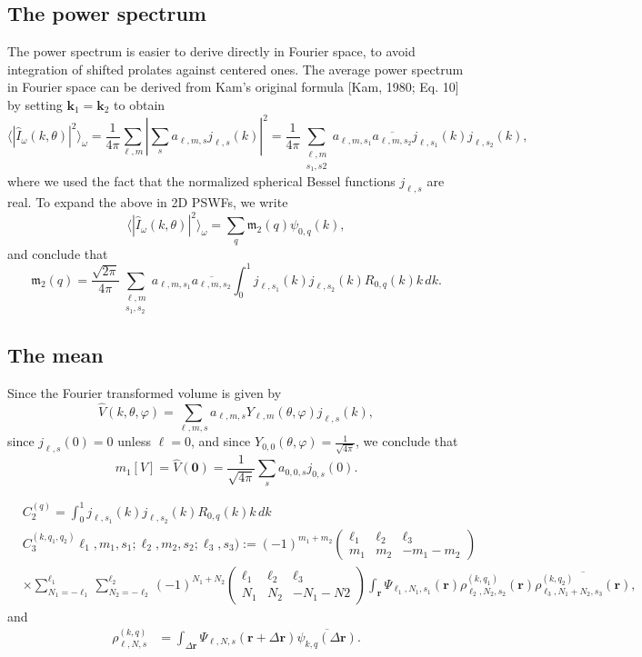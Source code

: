 \documentclass[english,11pt]{article}
\newcommand{\1}{\mathbf{1}}
\newcommand{\rr}{\textbf{r}}
\newcommand{\mb}{\mathbf}
\numberwithin{equation}{section}
\theoremstyle{plain}
\theoremstyle{definition}
\theoremstyle{remark}
\theoremstyle{plain}
\theoremstyle{remark}
\theoremstyle{plain}
\theoremstyle{plain}
\begin{document}
\subsection{The power spectrum}
The power spectrum is easier to derive directly in Fourier space, to
avoid integration of shifted prolates against centered ones. The
average power spectrum in Fourier space can be derived from Kam's
original formula [Kam, 1980; Eq. 10] by setting $\mb k_1 = \mb k_2$ to
obtain
\[ \langle |\widehat I_{\omega}(k,\theta)|^2\rangle_{\omega} =
\frac{1}{4\pi}\sum_{\ell,
	m}\left|\sum_sa_{\ell,m,s}j_{\ell,s}(k)\right|^2 =
\frac{1}{4\pi}\sum_{\substack{\ell,m\\s_1,s2}}a_{\ell,m,s_1}\overline{a_{\ell,m,s_2}}j_{\ell,s_1}(k)j_{\ell,s_2}(k),\]
where we used the fact that the normalized spherical Bessel functions
$j_{\ell,s}$ are real. To expand the above in 2D PSWFs, we write
\[ \langle |\widehat I_{\omega}(k,\theta)|^2\rangle_{\omega} =
\sum_{q}\mathfrak{m}_2(q)\psi_{0,q}(k),\]
and conclude that
\[ \mathfrak{m}_2(q) =
\frac{\sqrt{2\pi}}{4\pi}\sum_{\substack{\ell,m\\s_1,s_2}}a_{\ell,m,s_1}\overline{a_{\ell,m,s_2}}
\int_0^1j_{\ell,s_1}(k)j_{\ell,s_2}(k)R_{0,q}(k)k\, dk.\]

\subsection{The mean}

Since the Fourier transformed volume is given by
\[ \widehat V(k,\theta,\varphi) =
\sum_{\ell,m,s}a_{\ell,m,s}Y_{\ell,m}(\theta,\varphi)j_{\ell,s}(k),\]
since $j_{\ell,s}(0)=0$ unless $\ell=0$, and since
$Y_{0,0}(\theta,\varphi) = \frac{1}{\sqrt{4\pi}}$, we conclude that
\[ m_1[V] = \widehat V(\mb 0) = \frac{1}{\sqrt{4\pi}}\sum_sa_{0,0,s}j_{0,s}(0).\]


\begin{align*}
&C_2^{(q)} = \int_0^1j_{\ell,s_1}(k)j_{\ell,s_2}(k)R_{0,q}(k)k\, dk\\
&C_3^{(k,q_1,q_2)}\ell_1,m_1,s_1;\ell_2,m_2,s_2;\ell_3,s_3):= (-1)^{m_1+m_2}\left(\begin{array}{ccc}\ell_1 & \ell_2  & \ell_3\\ m_1 & m_2 & -m_1-m_2\end{array}\right)\\
&\times \sum_{N_1=-\ell_1}^{\ell_1}\sum_{N_2=-\ell_2}^{\ell_2}(-1)^{N_1+N_2}\left(\begin{array}{ccc}\ell_1 & \ell_2  & \ell_3\\ N_1 & N_2 & -N_1-N2\end{array}\right)\int_{\rr}\Psi_{\ell_1,N_1,s_1}(\rr)\rho_{\ell_2,N_2,s_2}^{(k,q_1)}(\rr)\overline{\rho_{\ell_3,N_1+N_2,s_3}^{(k,q_2)}(\rr)},
\end{align*}
and 
\begin{align*}
\rho_{\ell,N,s}^{(k,q)}&=\int_{\Delta\rr}\Psi_{\ell,N,s}(\rr+\Delta\rr)\overline{\psi_{k,q}(\Delta\rr)}.
\end{align*}
\end{document}
